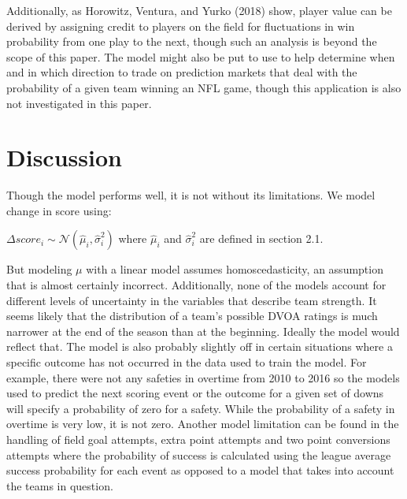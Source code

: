 \documentclass[12pt,twoside]{dukestatscithesis}
\begin{document}
Additionally, as Horowitz, Ventura, and Yurko (2018) show, player value can be derived by assigning credit to players on the field for fluctuations in win probability from one play to the next, though such an analysis is beyond the scope of this paper. The model might also be put to use to help determine when and in which direction to trade on prediction markets that deal with the probability of a given team winning an NFL game, though this application is also not investigated in this paper.

\hypertarget{discussion}{%
\chapter{Discussion}\label{discussion}}

Though the model performs well, it is not without its limitations. We model change in score using:

\(\Delta score_i \sim \mathcal{N}(\hat{\mu}_i,\hat{\sigma}^{2}_i)\) where
\(\hat{\mu}_i\) and \(\hat{\sigma}^{2}_i\) are defined in section 2.1.

But modeling \(\mu\) with a linear model assumes homoscedasticity, an assumption that is almost certainly incorrect. Additionally, none of the models account for different levels of uncertainty in the variables that describe team strength. It seems likely that the distribution of a team's possible DVOA ratings is much narrower at the end of the season than at the beginning. Ideally the model would reflect that. The model is also probably slightly off in certain situations where a specific outcome has not occurred in the data used to train the model. For example, there were not any safeties in overtime from 2010 to 2016 so the models used to predict the next scoring event or the outcome for a given set of downs will specify a probability of zero for a safety. While the probability of a safety in overtime is very low, it is not zero. Another model limitation can be found in the handling of field goal attempts, extra point attempts and two point conversions attempts where the probability of success is calculated using the league average success probability for each event as opposed to a model that takes into account the teams in question.
\end{document}
